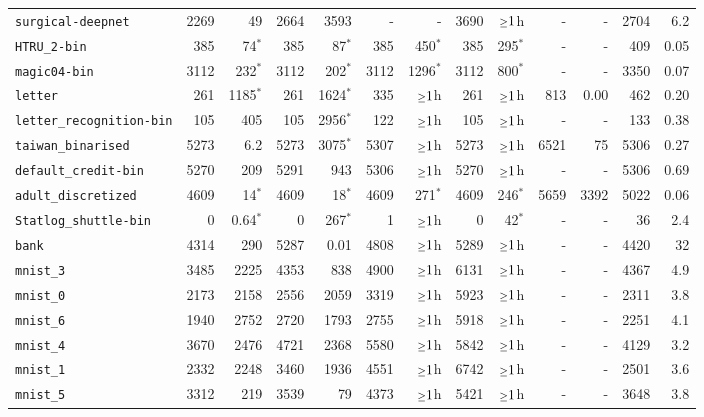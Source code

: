 \begin{tabular}{lrrrrrrrrrrrr}
\texttt{surgical-deepnet} & 2269 & 49 & 2664 & 3593 & - & - & 3690 & $\mathsmaller{\geq}1$h & - & - & 2704 & 6.2\\
\texttt{HTRU\_2-bin} & 385 & 74$^*$ & 385 & 87$^*$ & 385 & 450$^*$ & 385 & 295$^*$ & - & - & 409 & 0.05\\
\texttt{magic04-bin} & 3112 & 232$^*$ & 3112 & 202$^*$ & 3112 & 1296$^*$ & 3112 & 800$^*$ & - & - & 3350 & 0.07\\
\texttt{letter} & 261 & 1185$^*$ & 261 & 1624$^*$ & 335 & $\mathsmaller{\geq}1$h & 261 & $\mathsmaller{\geq}1$h & 813 & 0.00 & 462 & 0.20\\
\texttt{letter\_recognition-bin} & 105 & 405 & 105 & 2956$^*$ & 122 & $\mathsmaller{\geq}1$h & 105 & $\mathsmaller{\geq}1$h & - & - & 133 & 0.38\\
\texttt{taiwan\_binarised} & 5273 & 6.2 & 5273 & 3075$^*$ & 5307 & $\mathsmaller{\geq}1$h & 5273 & $\mathsmaller{\geq}1$h & 6521 & 75 & 5306 & 0.27\\
\texttt{default\_credit-bin} & 5270 & 209 & 5291 & 943 & 5306 & $\mathsmaller{\geq}1$h & 5270 & $\mathsmaller{\geq}1$h & - & - & 5306 & 0.69\\
\texttt{adult\_discretized} & 4609 & 14$^*$ & 4609 & 18$^*$ & 4609 & 271$^*$ & 4609 & 246$^*$ & 5659 & 3392 & 5022 & 0.06\\
\texttt{Statlog\_shuttle-bin} & 0 & 0.64$^*$ & 0 & 267$^*$ & 1 & $\mathsmaller{\geq}1$h & 0 & 42$^*$ & - & - & 36 & 2.4\\
\texttt{bank} & 4314 & 290 & 5287 & 0.01 & 4808 & $\mathsmaller{\geq}1$h & 5289 & $\mathsmaller{\geq}1$h & - & - & 4420 & 32\\
\texttt{mnist\_3} & 3485 & 2225 & 4353 & 838 & 4900 & $\mathsmaller{\geq}1$h & 6131 & $\mathsmaller{\geq}1$h & - & - & 4367 & 4.9\\
\texttt{mnist\_0} & 2173 & 2158 & 2556 & 2059 & 3319 & $\mathsmaller{\geq}1$h & 5923 & $\mathsmaller{\geq}1$h & - & - & 2311 & 3.8\\
\texttt{mnist\_6} & 1940 & 2752 & 2720 & 1793 & 2755 & $\mathsmaller{\geq}1$h & 5918 & $\mathsmaller{\geq}1$h & - & - & 2251 & 4.1\\
\texttt{mnist\_4} & 3670 & 2476 & 4721 & 2368 & 5580 & $\mathsmaller{\geq}1$h & 5842 & $\mathsmaller{\geq}1$h & - & - & 4129 & 3.2\\
\texttt{mnist\_1} & 2332 & 2248 & 3460 & 1936 & 4551 & $\mathsmaller{\geq}1$h & 6742 & $\mathsmaller{\geq}1$h & - & - & 2501 & 3.6\\
\texttt{mnist\_5} & 3312 & 219 & 3539 & 79 & 4373 & $\mathsmaller{\geq}1$h & 5421 & $\mathsmaller{\geq}1$h & - & - & 3648 & 3.8\\

\end{tabular}
